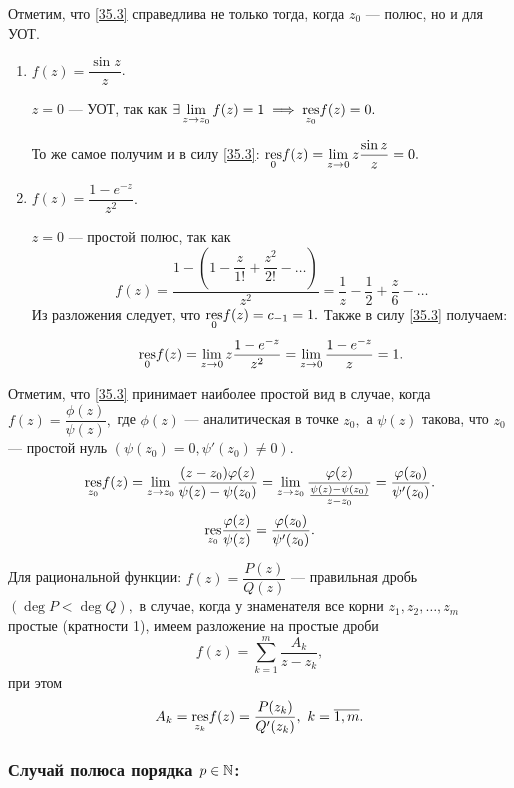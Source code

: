 \documentclass[../../main.tex]{subfiles}
\begin{document}
	Отметим, что \eqref{35.3} справедлива не только тогда, когда $z_0$ --- полюс,
	но и для УОТ.
	
	\begin{examples}
		\;
		
		\begin{enumerate}
			\item 
			$f(z) = \dfrac{\sin z}{z}$.
			
			$ z = 0 $ --- УОТ, так как 
			$\exists \lim\limits_{z\to z_0} f(z) = 1 \implies \underset{z_0}{\operatorname{res}}f(z) = 0.$
			
			То же самое получим и в силу \eqref{35.3}: 
			$\underset{0}{\operatorname{res}}f(z)= \lim\limits_{z\to 0}z \dfrac{\sin z}{z} = 0.$
			\item
			$f(z) = \dfrac{1-e^{-z}}{z^2}$.
			
			$z = 0$ --- простой полюс, так как 
			\[
				f(z) = \dfrac{1- \left(1-\dfrac{z}{1!}+\dfrac{z^2}{2!}-\ldots\right)}{z^2} 
				= \frac{1}{z} - \frac{1}{2} + \frac{z}{6}- \ldots
			\]
			Из разложения следует, что $\underset{0}{\operatorname{res}}f(z) = c_{-1} = 1.$ Также в 
			силу \eqref{35.3} получаем:
			\[
			\underset{0}{\operatorname{res}}f(z) = \lim_{z\to 0}z\dfrac{1-e^{-z}}{z^2} =
			 \lim_{z\to 0}\dfrac{1-e^{-z}}{z} = 1.
			\]
		\end{enumerate}
	\end{examples}
	
	Отметим, что \eqref{35.3} принимает наиболее простой вид в случае, когда 
	$f(z) = \dfrac{\phi(z)}{\psi(z)},$ где 
	$\phi(z)$ --- аналитическая в точке $z_0,$ а $\psi(z)$ такова, что $z_0$ --- 
	простой нуль $({\psi(z_0) = 0, \psi'(z_0) \ne 0}).$
	\[
		\underset{z_0}{\operatorname{res}} f(z) = \lim\limits_{z\to 
		z_0}\frac{(z-z_0)\varphi(z)}{\psi(z) - \psi(z_0)} = 
		\lim\limits_{z\to z_0}\frac{\varphi(z)}{\frac{\psi(z) - \psi(z_0)}{z - z_0}} 
		= \frac{\varphi(z_0)}{\psi'(z_0)}.
	\]
	\begin{equation}\label{35.4}
		\underset{z_0}{\operatorname{res}} \frac{\varphi(z)}{\psi(z)} = 
		\frac{\varphi(z_0)}{\psi'(z_0)}.
	\end{equation}
	
	Для рациональной функции: $f(z) = \dfrac{P(z)}{Q(z)}$ --- правильная 
	дробь $(\deg P < \deg Q),$ в случае, когда у знаменателя все корни $z_1, z_2, 
	\ldots, z_m$ простые (кратности 1), имеем разложение на простые дроби 
	\[
		f(z) = \sum_{k=1}^{m}\frac{A_k}{z-z_k},
	\]
	при этом
	\[
		A_k = 	\underset{z_k}{\res} f(z) = \dfrac{P(z_k)}{Q'(z_k)},\ 
		k = \overline{1, m}.
	\]
	
	\subsubsection*{Случай полюса порядка $p \in \mathbb{N}$:}
	
\end{document}
